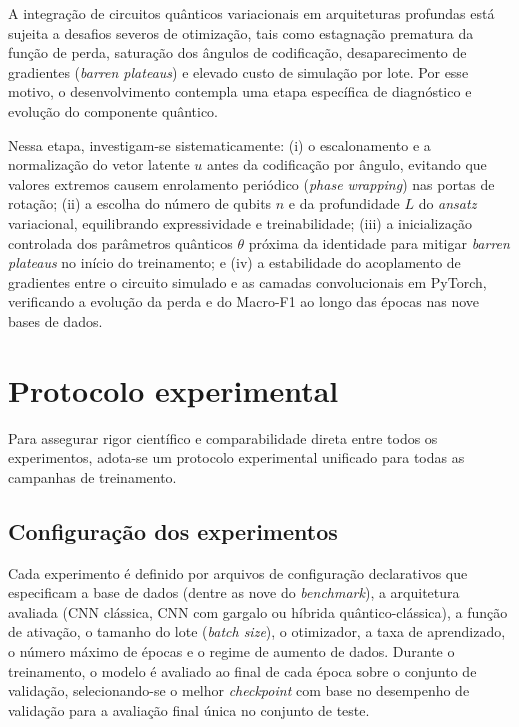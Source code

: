 \documentclass[
    12pt,
    openright,
    oneside,
    a4paper,
    english,
    brazil
]{abntex2}
\begin{document}
A integração de circuitos quânticos variacionais em arquiteturas profundas está sujeita a desafios severos de otimização, tais como estagnação prematura da função de perda, saturação dos ângulos de codificação, desaparecimento de gradientes (\textit{barren plateaus}) e elevado custo de simulação por lote. Por esse motivo, o desenvolvimento contempla uma etapa específica de diagnóstico e evolução do componente quântico.

Nessa etapa, investigam-se sistematicamente: (i) o escalonamento e a normalização do vetor latente \(u\) antes da codificação por ângulo, evitando que valores extremos causem enrolamento periódico (\textit{phase wrapping}) nas portas de rotação; (ii) a escolha do número de qubits \(n\) e da profundidade \(L\) do \textit{ansatz} variacional, equilibrando expressividade e treinabilidade; (iii) a inicialização controlada dos parâmetros quânticos \(\theta\) próxima da identidade para mitigar \textit{barren plateaus} no início do treinamento; e (iv) a estabilidade do acoplamento de gradientes entre o circuito simulado e as camadas convolucionais em PyTorch, verificando a evolução da perda e do Macro-F1 ao longo das épocas nas nove bases de dados.

\section{Protocolo experimental}

Para assegurar rigor científico e comparabilidade direta entre todos os experimentos, adota-se um protocolo experimental unificado para todas as campanhas de treinamento.

\subsection{Configuração dos experimentos}

Cada experimento é definido por arquivos de configuração declarativos que especificam a base de dados (dentre as nove do \textit{benchmark}), a arquitetura avaliada (CNN clássica, CNN com gargalo ou híbrida quântico-clássica), a função de ativação, o tamanho do lote (\textit{batch size}), o otimizador, a taxa de aprendizado, o número máximo de épocas e o regime de aumento de dados. Durante o treinamento, o modelo é avaliado ao final de cada época sobre o conjunto de validação, selecionando-se o melhor \textit{checkpoint} com base no desempenho de validação para a avaliação final única no conjunto de teste.
\end{document}
